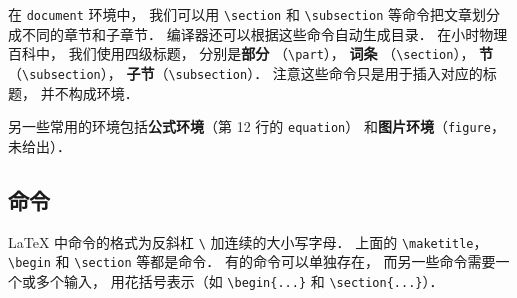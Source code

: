 在 \lstinline|document| 环境中， 我们可以用 \lstinline|\section| 和 \lstinline|\subsection| 等命令把文章划分成不同的章节和子章节． 编译器还可以根据这些命令自动生成目录． 在小时物理百科中， 我们使用四级标题， 分别是\textbf{部分} （\lstinline|\part|）， \textbf{词条} （\lstinline|\section|）， \textbf{节}（\lstinline|\subsection|）， \textbf{子节}（\lstinline|\subsection|）． 注意这些命令只是用于插入对应的标题， 并不构成环境．

另一些常用的环境包括\textbf{公式环境}（第 12 行的 \lstinline|equation|） 和\textbf{图片环境}（\lstinline|figure|， 未给出）．

\subsection{命令}
LaTeX 中命令的格式为反斜杠 \lstinline|\| 加连续的大小写字母． 上面的 \lstinline|\maketitle|， \lstinline|\begin| 和 \lstinline|\section| 等都是命令． 有的命令可以单独存在， 而另一些命令需要一个或多个输入， 用花括号表示（如 \lstinline|\begin{...}| 和 \lstinline|\section{...}|）．

